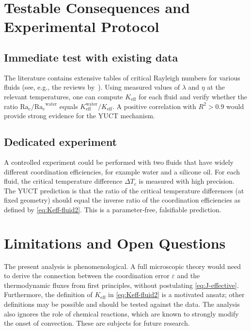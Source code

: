 \documentclass[12pt,a4paper]{article}
\begin{document}
	\section{Testable Consequences and Experimental Protocol}
	
	\subsection{Immediate test with existing data}
	The literature contains extensive tables of critical Rayleigh numbers for various fluids (see, e.g., the reviews by~\cite{Chandrasekhar1961, Cross1993}).  Using measured values of \(\lambda\) and \(\eta\) at the relevant temperatures, one can compute \(K_{\mathrm{eff}}\) for each fluid and verify whether the ratio \(\mathrm{Ra_c}/\mathrm{Ra_c}^{\mathrm{water}}\) equals \(K_{\mathrm{eff}}^{\mathrm{water}} / K_{\mathrm{eff}}\).  A positive correlation with \(R^2 > 0.9\) would provide strong evidence for the YUCT mechanism.
	
	\subsection{Dedicated experiment}
	A controlled experiment could be performed with two fluids that have widely different coordination efficiencies, for example water and a silicone oil.  For each fluid, the critical temperature difference \(\Delta T_c\) is measured with high precision.  The YUCT prediction is that the ratio of the critical temperature differences (at fixed geometry) should equal the inverse ratio of the coordination efficiencies as defined by \eqref{eq:Keff-fluid2}.  This is a parameter‑free, falsifiable prediction.
	
	\section{Limitations and Open Questions}
	
	The present analysis is phenomenological.  A full microscopic theory would need to derive the connection between the coordination error \(\varepsilon\) and the thermodynamic fluxes from first principles, without postulating \eqref{eq:J-effective}.  Furthermore, the definition of \(K_{\mathrm{eff}}\) in \eqref{eq:Keff-fluid2} is a motivated ansatz; other definitions may be possible and should be tested against the data.  The analysis also ignores the role of chemical reactions, which are known to strongly modify the onset of convection.  These are subjects for future research.
	
\end{document}
